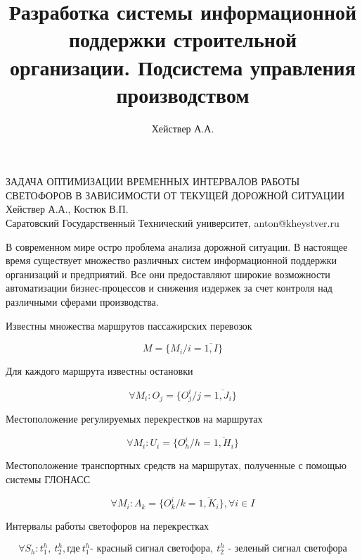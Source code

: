 \documentclass[a4paper,13pt]{article}
\title{Разработка системы информационной поддержки строительной организации. Подсистема управления производством}
\author{Хействер А.А.}
\date{}
\begin{document}
\begin{center} %
    \large ЗАДАЧА ОПТИМИЗАЦИИ ВРЕМЕННЫХ ИНТЕРВАЛОВ РАБОТЫ СВЕТОФОРОВ В ЗАВИСИМОСТИ ОТ ТЕКУЩЕЙ ДОРОЖНОЙ СИТУАЦИИ\\
    \large Хействер А.А., Костюк В.П.\\
    \large Саратовский Государственный Технический университет, anton@kheystver.ru
\end{center} %
\thispagestyle{empty} %
В современном мире остро проблема анализа дорожной ситуации. В настоящее время существует множество различных систем информационной поддержки организаций и предприятий. Все они предоставляют широкие возможности автоматизации бизнес-процессов и снижения издержек за счет контроля над различными сферами производства.

Известны множества маршрутов пассажирских перевозок

\begin{equation}\label{eq:marshruts}
M = \{ M_i/i= \overline{1,I} \}
\end{equation}

Для каждого маршрута известны остановки

\begin{equation}\label{eq:stops}
\forall M_i :O_j = \{ O^i_{j}/j = \overline{1,J_i} \}
\end{equation}

Местоположение регулируемых перекрестков на маршрутах

\begin{equation}\label{eq:crosses}
\forall M_i :U_i = \{ O^i_{h}/h = \overline{1,H_i} \}
\end{equation}

Местоположение транспортных средств на маршрутах, полученные с помощью системы ГЛОНАСС

\begin{equation}\label{eq:objects}
\forall M_i :A_k = \{ O^i_{k}/k = \overline{1,K_i} \}, \forall{i} \in I
\end{equation}

Интервалы работы светофоров на перекрестках

\begin{equation}\label{eq:crosstime}
\forall S_h :t^h_{1},\ t^h_{2}, \text{где} \ t^h_{1}\text{- красный сигнал светофора}, \ t^h_{2}\text{ - зеленый сигнал светофора}
\end{equation}
\end{document}
